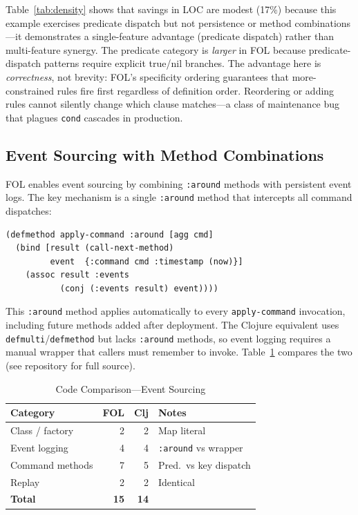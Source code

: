 \documentclass[sigconf,nonacm,review]{acmart}
\begin{document}
Table~\ref{tab:density} shows that savings in LOC are modest (17\%) because this example exercises predicate dispatch but not persistence or method combinations---it demonstrates a single-feature advantage (predicate dispatch)
rather than multi-feature synergy. The predicate category is \textit{larger} in FOL because predicate-dispatch patterns require explicit true/nil branches. The advantage here is \textit{correctness}, not
brevity: FOL's specificity ordering guarantees that more-constrained rules fire first regardless of definition order. Reordering or adding rules cannot silently change which clause matches---a class of
maintenance bug that plagues \texttt{cond} cascades in production.

\subsection{Event Sourcing with Method Combinations}

FOL enables event sourcing by combining \texttt{:around} methods with persistent event logs. The key mechanism is a single \texttt{:around} method that intercepts all command dispatches:

\begin{lstlisting}
(defmethod apply-command :around [agg cmd]
  (bind [result (call-next-method)
         event  {:command cmd :timestamp (now)}]
    (assoc result :events
           (conj (:events result) event))))
\end{lstlisting}

This \texttt{:around} method applies automatically to every \texttt{apply-command} invocation, including future methods added after deployment. The Clojure equivalent uses \texttt{defmulti}/\texttt{defmethod} but
lacks \texttt{:around} methods, so event logging requires a manual wrapper that callers must remember to invoke. Table~\ref{tab:eventsourcing} compares the two (see repository for full source).

\begin{table}[htbp]
\caption{Code Comparison---Event Sourcing}
\label{tab:eventsourcing}
\begin{tabular}{lrrl}
\toprule
\textbf{Category} & \textbf{FOL} & \textbf{Clj} & \textbf{Notes} \\
\midrule
Class / factory & 2 & 2 & Map literal \\
Event logging & 4 & 4 & \texttt{:around} vs wrapper \\
Command methods & 7 & 5 & Pred.\ vs key dispatch \\
Replay & 2 & 2 & Identical \\
\textbf{Total} & \textbf{15} & \textbf{14} & \\
\bottomrule
\end{tabular}
\end{table}
\end{document}
